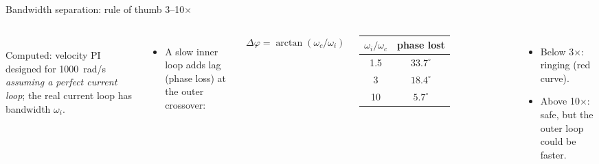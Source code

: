 \documentclass[aspectratio=169,10pt]{beamer}
\begin{document}
\begin{frame}[t]{Bandwidth separation: rule of thumb 3--10$\times$}
\begin{columns}[T,onlytextwidth]
\\
\scriptsize Computed: velocity PI designed for \SI{1000}{rad/s} \emph{assuming a perfect current loop}; the real current loop has bandwidth $\omega_i$.
\begin{itemize}\small
\item A slow inner loop adds lag (phase loss) at the outer crossover:
\end{itemize}
\begin{eqbox}\centering
$\Delta\varphi=\arctan(\omega_c/\omega_i)$
\end{eqbox}
\small
\begin{tabular}{@{}cc@{}}
\toprule
$\omega_i/\omega_c$ & phase lost\\
\midrule
1.5 & $33.7^\circ$\\
3 & $18.4^\circ$\\
10 & $5.7^\circ$\\
\bottomrule
\end{tabular}
\begin{itemize}\small
\item Below 3$\times$: ringing (red curve).
\item Above 10$\times$: safe, but the outer loop could be faster.
\end{itemize}
\end{columns}
\end{frame}
\end{document}
